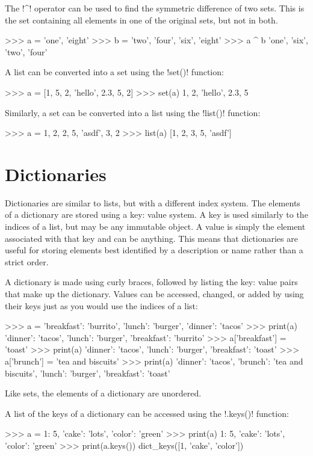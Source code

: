 \documentclass[11pt]{cselabheader}
\begin{document}
The \pythoninline!^! operator can be used to find the symmetric difference
of two sets. This is the set containing all elements in one of the original
sets, but not in both.
\begin{pyconcode}
>>> a = {'one', 'eight'}
>>> b = {'two', 'four', 'six', 'eight'}
>>> a ^ b
{'one', 'six', 'two', 'four'}
\end{pyconcode}

A list can be converted into a set using the \pythoninline!set()! function:
\begin{pyconcode}
>>> a = [1, 5, 2, 'hello', 2.3, 5, 2]
>>> set(a)
{1, 2, 'hello', 2.3, 5}
\end{pyconcode}

Similarly, a set can be converted into a list using the \pythoninline!list()!
function:
\begin{pyconcode}
>>> a = {1, 2, 2, 5, 'asdf', 3, 2}
>>> list(a)
[1, 2, 3, 5, 'asdf']
\end{pyconcode}


\section{Dictionaries}
Dictionaries are similar to lists, but with a different index system.
The elements of a dictionary are stored using a key: value system. A key
is used similarly to the indices of a list, but may be any immutable
object. A value is simply the element associated with that key and can be
anything. This means that dictionaries are useful for storing elements best
identified by a description or name rather than a strict order.

A dictionary is made using curly braces, followed by listing the key: value
pairs that make up the dictionary. Values can be accessed, changed, or added
by using their keys just as you would use the indices of a list:
\begin{pyconcode}
>>> a = {'breakfast': 'burrito', 'lunch': 'burger', 'dinner': 'tacos'}
>>> print(a)
{'dinner': 'tacos', 'lunch': 'burger', 'breakfast': 'burrito'}
>>> a['breakfast'] = 'toast'
>>> print(a)
{'dinner': 'tacos', 'lunch': 'burger', 'breakfast': 'toast'}
>>> a['brunch'] = 'tea and biscuits'
>>> print(a)
{'dinner': 'tacos', 'brunch': 'tea and biscuits', 'lunch': 'burger', 'breakfast': 'toast'}
\end{pyconcode}

Like sets, the elements of a dictionary are unordered.

A list of the keys of a dictionary can be accessed using the
\pythoninline!.keys()! function:
\begin{pyconcode}
>>> a = {1: 5, 'cake': 'lots', 'color': 'green'}
>>> print(a)
{1: 5, 'cake': 'lots', 'color': 'green'}
>>> print(a.keys())
dict_keys([1, 'cake', 'color'])
\end{pyconcode}
\end{document}
